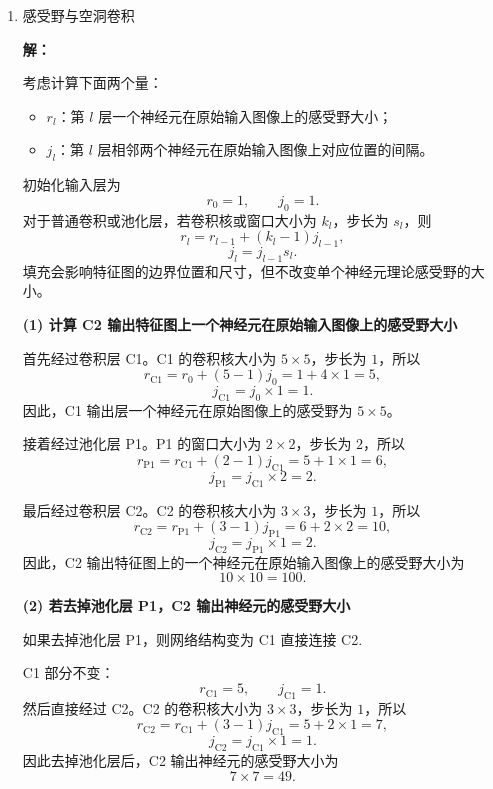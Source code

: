 \documentclass[a4paper]{article}
\newenvironment{solution}{\par\noindent\textbf{解：}\par}{\par}
\begin{document}
\begin{enumerate}
\begin{solution}
于是该全连接层的可训练参数总数为
\[
393216+128=393344.
\]

与卷积层 1 的参数数量 $1216$ 相比，全连接层的参数数量明显更多。二者的比值为
\[
\frac{393344}{1216}\approx 323.47.
\]
可见卷积层通过局部连接和权重共享，大幅减少了模型参数量。
\end{solution}

\item 感受野与空洞卷积

\begin{solution}
考虑计算下面两个量：
\begin{itemize}
    \item $r_l$：第 $l$ 层一个神经元在原始输入图像上的感受野大小；
    \item $j_l$：第 $l$ 层相邻两个神经元在原始输入图像上对应位置的间隔。
\end{itemize}

初始化输入层为
\[
r_0=1,\qquad j_0=1.
\]
对于普通卷积或池化层，若卷积核或窗口大小为 $k_l$，步长为 $s_l$，则
\[
r_l=r_{l-1}+(k_l-1)j_{l-1},
\]
\[
j_l=j_{l-1}s_l.
\]
填充会影响特征图的边界位置和尺寸，但不改变单个神经元理论感受野的大小。

\textbf{(1) 计算 C2 输出特征图上一个神经元在原始输入图像上的感受野大小}

首先经过卷积层 C1。C1 的卷积核大小为 $5\times 5$，步长为 $1$，所以
\[
r_{\mathrm{C1}}
=
r_0+(5-1)j_0
=
1+4\times 1
=
5,
\]
\[
j_{\mathrm{C1}}
=
j_0\times 1
=
1.
\]
因此，C1 输出层一个神经元在原始图像上的感受野为 $5\times 5$。

接着经过池化层 P1。P1 的窗口大小为 $2\times 2$，步长为 $2$，所以
\[
r_{\mathrm{P1}}
=
r_{\mathrm{C1}}+(2-1)j_{\mathrm{C1}}
=
5+1\times 1
=
6,
\]
\[
j_{\mathrm{P1}}
=
j_{\mathrm{C1}}\times 2
=
2.
\]

最后经过卷积层 C2。C2 的卷积核大小为 $3\times 3$，步长为 $1$，所以
\[
r_{\mathrm{C2}}
=
r_{\mathrm{P1}}+(3-1)j_{\mathrm{P1}}
=
6+2\times 2
=
10,
\]
\[
j_{\mathrm{C2}}
=
j_{\mathrm{P1}}\times 1
=
2.
\]
因此，C2 输出特征图上的一个神经元在原始输入图像上的感受野大小为
\[
10\times 10=100.
\]

\textbf{(2) 若去掉池化层 P1，C2 输出神经元的感受野大小}

如果去掉池化层 P1，则网络结构变为 C1 直接连接 C2.

C1 部分不变：
\[
r_{\mathrm{C1}}=5,\qquad j_{\mathrm{C1}}=1.
\]
然后直接经过 C2。C2 的卷积核大小为 $3\times 3$，步长为 $1$，所以
\[
r_{\mathrm{C2}}
=
r_{\mathrm{C1}}+(3-1)j_{\mathrm{C1}}
=
5+2\times 1
=
7,
\]
\[
j_{\mathrm{C2}}
=
j_{\mathrm{C1}}\times 1
=
1.
\]
因此去掉池化层后，C2 输出神经元的感受野大小为
\[
7\times 7=49.
\]


\end{solution}
\end{enumerate}
\end{document}
